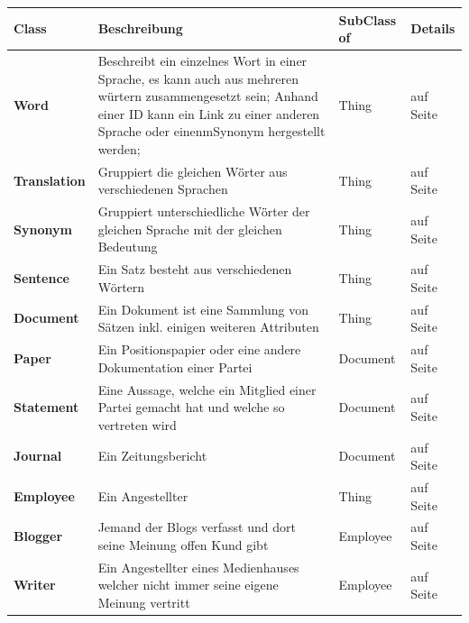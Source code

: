 ﻿\documentclass[
    11pt,
    latin1,
    a4paper,
    oneside
]{scrreprt}
\begin{document}
\begin{table}[h]
	\centering
	\begin{tabular}{ | l | p{5cm} | l | l| }
		\hline
	\textbf{Class} & \textbf{Beschreibung} & \textbf{SubClass of} & \textbf{Details} \\ \hline
	\textbf{Word} & Beschreibt ein einzelnes Wort in einer Sprache, es kann auch aus mehreren würtern zusammengesetzt sein; Anhand einer ID kann ein Link zu einer anderen Sprache oder einenmSynonym hergestellt werden; & Thing & \nameref{sec:class_word} auf Seite \pageref{sec:class_word} \\ \hline
	\textbf{Translation} & Gruppiert die gleichen W\"örter aus verschiedenen Sprachen & Thing & \nameref{sec:class_translation} auf Seite \pageref{sec:class_translation} \\ \hline
	\textbf{Synonym} & Gruppiert unterschiedliche W\"örter der gleichen Sprache mit der gleichen Bedeutung & Thing & \nameref{sec:class_synonym} auf Seite \pageref{sec:class_synonym} \\ \hline
		\textbf{Sentence} & Ein Satz besteht aus verschiedenen Wörtern & Thing & \nameref{sec:class_sentence} auf Seite \pageref{sec:class_sentence} \\ \hline
		\textbf{Document} & Ein Dokument ist eine Sammlung von Sätzen inkl. einigen weiteren Attributen & Thing & \nameref{sec:class_document} auf Seite \pageref{sec:class_document} \\ \hline
		\textbf{Paper} & Ein Positionspapier oder eine andere Dokumentation einer Partei & Document & \nameref{sec:class_paper} auf Seite \pageref{sec:class_paper} \\ \hline
		\textbf{Statement} & Eine Aussage, welche ein Mitglied einer Partei gemacht hat und welche so vertreten wird & Document & \nameref{sec:class_statement} auf Seite \pageref{sec:class_statement} \\ \hline
		\textbf{Journal} & Ein Zeitungsbericht & Document & \nameref{sec:class_journal} auf Seite \pageref{sec:class_journal} \\ \hline
		\textbf{Employee} & Ein Angestellter & Thing & \nameref{sec:class_employee} auf Seite \pageref{sec:class_employee} \\ \hline
		\textbf{Blogger} & Jemand der Blogs verfasst und dort seine Meinung offen Kund gibt & Employee & \nameref{sec:class_blogger} auf Seite \pageref{sec:class_blogger} \\ \hline
		\textbf{Writer} & Ein Angestellter eines Medienhauses welcher nicht immer seine eigene Meinung vertritt & Employee & \nameref{sec:class_writer} auf Seite \pageref{sec:class_writer} \\ \hline

\end{tabular}
\end{table}
\end{document}
